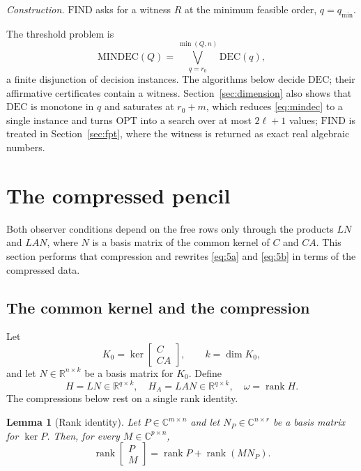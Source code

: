 \documentclass[journal]{IEEEtran}
\theoremstyle{plainn}
\newtheorem{lem}[thm]{Lemma}
\theoremstyle{remark}
\begin{document}
\emph{Construction.} $\mathrm{FIND}$ asks for a witness $R$ at the minimum feasible
order, $q=q_{\min}$.

The threshold problem is
\begin{equation}\label{eq:mindec}
\mathrm{MINDEC}(Q)=\bigvee_{q=r_0}^{\min(Q,n)}\mathrm{DEC}(q),
\end{equation}
a finite disjunction of decision instances. The algorithms below decide $\mathrm{DEC}$;
their affirmative certificates contain a witness. Section~\ref{sec:dimension} also shows
that $\mathrm{DEC}$ is monotone in $q$ and saturates at $r_0+m$, which reduces
\eqref{eq:mindec} to a single instance and turns $\mathrm{OPT}$ into a search over at most
$2\ell+1$ values; $\mathrm{FIND}$ is treated in Section~\ref{sec:fpt}, where the witness is
returned as exact real algebraic numbers.

\section{The compressed pencil}\label{sec:compressed}

Both observer conditions depend on the free rows only through the products $LN$ and $LAN$, where $N$ is a basis matrix of the common kernel of $C$ and $CA$. This section performs that compression and rewrites \eqref{eq:5a} and \eqref{eq:5b} in terms of the compressed data.

\subsection{The common kernel and the compression}\label{sec:compress}

Let
\begin{equation*}
K_0=\ker\begin{bmatrix}C\\ CA\end{bmatrix},\qquad k=\dim K_0,
\end{equation*}
and let $N\in\mathbb R^{n\times k}$ be a basis matrix for $K_0$. Define
\begin{equation*}
H=LN\in\mathbb R^{q\times k},\quad H_A=LAN\in\mathbb R^{q\times k},\quad \omega=\operatorname{rank}H .
\end{equation*}
The compressions below rest on a single rank identity.

\begin{lem}[Rank identity]\label{lem:rankid}
Let $P\in\mathbb C^{m\times n}$ and let $N_P\in\mathbb C^{n\times r}$ be a basis matrix for $\ker P$. Then, for every $M\in\mathbb C^{p\times n}$,
\begin{equation}\label{eq:rankid}
\operatorname{rank}\begin{bmatrix}P\\ M\end{bmatrix}
=\operatorname{rank}P+\operatorname{rank}(MN_P).
\end{equation}
\end{lem}
\end{document}
